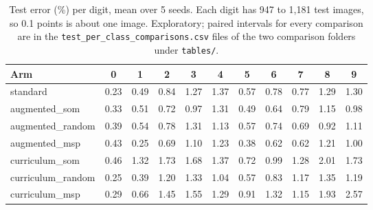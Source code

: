 \begin{table}[H]
\centering
\renewcommand{\arraystretch}{1.1}
\small
{\setlength{\tabcolsep}{4pt}\begin{tabular}{|l|c|c|c|c|c|c|c|c|c|c|}
\hline
\textbf{Arm} & \textbf{0} & \textbf{1} & \textbf{2} & \textbf{3} & \textbf{4} & \textbf{5} & \textbf{6} & \textbf{7} & \textbf{8} & \textbf{9} \\ \hline
standard & 0.23 & 0.49 & 0.84 & 1.27 & 1.37 & 0.57 & 0.78 & 0.77 & 1.29 & 1.30 \\ \hline
augmented\_som & 0.33 & 0.51 & 0.72 & 0.97 & 1.31 & 0.49 & 0.64 & 0.79 & 1.15 & 0.98 \\ \hline
augmented\_random & 0.39 & 0.54 & 0.78 & 1.31 & 1.13 & 0.57 & 0.74 & 0.69 & 0.92 & 1.11 \\ \hline
augmented\_msp & 0.43 & 0.25 & 0.69 & 1.10 & 1.23 & 0.38 & 0.62 & 0.62 & 1.21 & 1.00 \\ \hline
curriculum\_som & 0.46 & 1.32 & 1.73 & 1.68 & 1.37 & 0.72 & 0.99 & 1.28 & 2.01 & 1.73 \\ \hline
curriculum\_random & 0.25 & 0.39 & 1.20 & 1.33 & 1.04 & 0.57 & 0.83 & 1.17 & 1.35 & 1.19 \\ \hline
curriculum\_msp & 0.29 & 0.66 & 1.45 & 1.55 & 1.29 & 0.91 & 1.32 & 1.15 & 1.93 & 2.57 \\ \hline
\end{tabular}}
\caption{Test error (\%) per digit, mean over 5 seeds. Each digit has 947 to 1,181 test images, so 0.1 points is about one image. Exploratory; paired intervals for every comparison are in the \texttt{test\_per\_class\_comparisons.csv} files of the two comparison folders under \texttt{tables/}.}
\label{tab:per_class}
\end{table}
